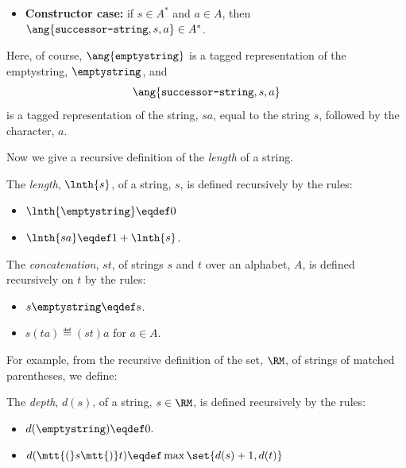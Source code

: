 \begin{definition}
\begin{definition}
\begin{itemize}
\item \textbf{Constructor case:} if $s \in A^*$ and $a \in A$, then
$\ang{\texttt{successor-string},s,a}\in A^*$.

\end{itemize}
\end{definition}
Here, of course, $\ang{\texttt{emptystring}}$ is a tagged representation
of the emptystring, $\emptystring$, and
\[
\ang{\texttt{successor-string}, s, a}
\]
is a tagged representation of the string, $sa$, equal to the string $s$,
followed by the character, $a$.

Now we give a recursive definition of the \emph{length} of a string.
\begin{definition}
The \emph{length}, $\lnth{s}$, of a string, $s$, is defined recursively by
the rules:
\begin{itemize}
\item $\lnth{\emptystring} \eqdef 0$
\item $\lnth{sa} \eqdef 1+\lnth{s}$.
\end{itemize}
\end{definition}

\begin{definition}
The \emph{concatenation}, $st$, of strings $s$ and $t$ over an alphabet,
$A$, is defined recursively on $t$ by the rules:
\begin{itemize}
\item $s\emptystring \eqdef s$.
\item $s(ta) \eqdef (st)a$ for $a \in A$.
\end{itemize}
\end{definition}
\fi

For example, from the recursive definition of the set, $\RM$, of strings of
matched parentheses, we define:
\begin{definition}
The \emph{depth}, $d(s)$, of a string, $s \in\RM$, is defined
recursively by the rules:
\begin{itemize}
\item $d(\emptystring) \eqdef 0.$
\item $d(\mtt{(}s\mtt{)}t)
    \eqdef \max \set{d(s) + 1, d(t)}$
\end{itemize}
\end{definition}



\end{definition}
